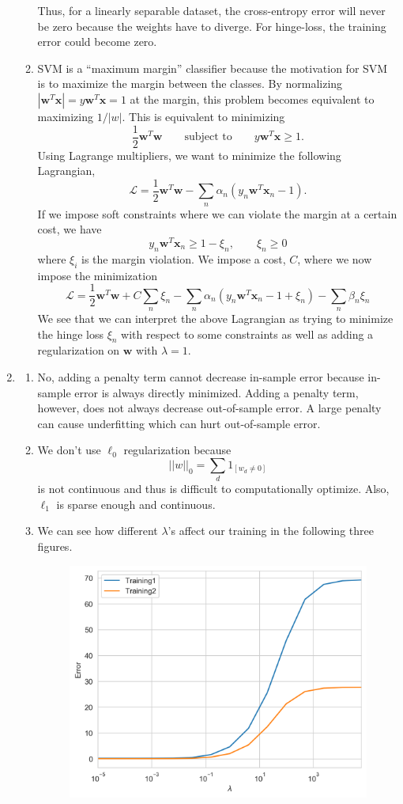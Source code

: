 \documentclass[12pt]{article}
\newcommand{\x}{\mathbf x}
\newcommand{\w}{\mathbf w}
\begin{document}
\begin{enumerate}[leftmargin=*]
\begin{enumerate}[label = \Alph*.]
Thus, for a linearly separable dataset, the cross-entropy error will never be zero because the weights have to diverge. For hinge-loss, the training error could become zero.
\item SVM is a ``maximum margin'' classifier because the motivation for SVM is to maximize the margin between the classes. By normalizing $|\w^T \x| = y \w^T \x =1$ at the margin, this problem becomes equivalent to maximizing $1 / |w|$. This is equivalent to minimizing
\[ \frac{1}{2} \w^T \w \qquad \text{subject to} \qquad y \w^T \x \geq 1. \]
Using Lagrange multipliers, we want to minimize the following Lagrangian,
\[ \mathcal L = \frac{1}{2} \w^T \w - \sum_n \alpha_n (y_n \w^T \x_n - 1). \]
If we impose soft constraints where we can violate the margin at a certain cost, we have
\[ y_n \w^T \x_n \geq 1 - \xi_n, \qquad \xi_n \geq 0 \]
where $\xi_i$ is the margin violation. We impose a cost, $C$, where we now impose the minimization
\[ \mathcal L = \frac{1}{2} \w^T \w + C \sum_n \xi_n - \sum_n \alpha_n (y_n \w^T \x_n - 1 + \xi_n) - \sum_n \beta_n \xi_n \]
We see that we can interpret the above Lagrangian as trying to minimize the hinge loss $\xi_n$ with respect to some constraints as well as adding a regularization on $\w$ with $\lambda = 1$.
\end{enumerate}
\item
\begin{enumerate}[label = \Alph*.]
\item No, adding a penalty term cannot decrease in-sample error because in-sample error is always directly minimized. Adding a penalty term, however, does not always decrease out-of-sample error. A large penalty can cause underfitting which can hurt out-of-sample error.
\item We don't use $\ell_0$ regularization because
\[ ||w||_0 = \sum_d 1_{[w_d \neq 0]} \]
is not continuous and thus is difficult to computationally optimize. Also, $\ell_1$ is sparse enough and continuous.
\item We can see how different $\lambda$'s affect our training in the following three figures.
\begin{figure}[h!]
\centering
\includegraphics[scale=0.56]{regEin.png}

\end{figure}
\end{enumerate}
\end{enumerate}
\end{document}
